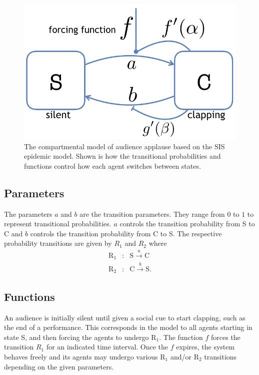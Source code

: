 \begin{figure}
 \centering
  \includegraphics[width=0.5\linewidth]{images/chapter2/model2.png}
  \caption{The compartmental model of audience applause based on the SIS epidemic model. Shown is how the transitional probabilities and functions control how each agent switches between states.}
  \label{fig:SCSmodel}
\end{figure}

\subsection{Parameters}
The parameters $a$ and $b$ are the transition parameters.
They range from $0$ to $1$ to represent transitional probabilities.
$a$ controls the transition probability from S to C and $b$ controls the transition probability from C to S.
The respective probability transitions are given by ${R}_{1}$ and ${R}_{2}$ where
\begin{eqnarray}
\mathrm{R}_{1} &:& \mathrm{S} \overset{a}{\longrightarrow} \mathrm{C} \label{eq:r1} \\
\mathrm{R}_{2} &:& \mathrm{C} \overset{b}{\longrightarrow} \mathrm{S}.\label{eq:r2}
\end{eqnarray}


\subsection{Functions}
An audience is initially silent until given a social cue to start clapping, such as the end of a performance. 
This corresponds in the model to all agents starting in state S, and then forcing the agents to undergo $\mathrm{R}_{1}$.
The function $f$ forces the transition ${R}_{1}$ for an indicated time interval.
Once the $f$ expires, the system behaves freely and its agents may undergo various $\mathrm{R}_{1}$ and/or $\mathrm{R}_{2}$ transitions depending on the given parameters.


